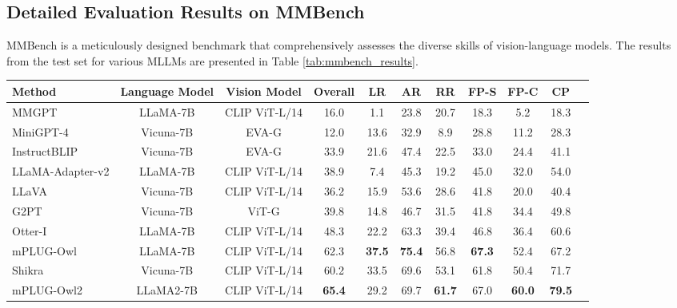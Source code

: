 \documentclass[10pt,twocolumn,letterpaper]{article}
\newcommand{\modelname}{mPLUG-Owl2\xspace}
\begin{document}
\subsection{Detailed Evaluation Results on MMBench}
MMBench \cite{liu2023mmbench} is a meticulously designed benchmark that comprehensively assesses the diverse skills of vision-language models. The results from the test set for various MLLMs are presented in Table \ref{tab:mmbench_results}.


\begin{table*}[!t]
\small
\centering
\begin{tabular}{l|cc|cccccccc}
\toprule
Method & Language Model & Vision Model & Overall & LR & AR & RR & FP-S & FP-C & CP \\
\midrule
MMGPT \cite{gong2023mmgpt} & LLaMA-7B & CLIP ViT-L/14 & 16.0 & 1.1 & 23.8 & 20.7 & 18.3 & 5.2 & 18.3 \\
MiniGPT-4 \cite{Zhu2023MiniGPT4} & Vicuna-7B & EVA-G & 12.0 & 13.6 & 32.9 & 8.9 & 28.8 & 11.2 & 28.3 \\
InstructBLIP \cite{Dai2023InstructBLIP} & Vicuna-7B & EVA-G & 33.9 & 21.6 & 47.4 & 22.5 & 33.0 & 24.4 & 41.1 \\
LLaMA-Adapter-v2 \cite{Gao2023LLaMAAdapterV2} & LLaMA-7B & CLIP ViT-L/14 & 38.9 & 7.4 & 45.3 & 19.2 & 45.0 & 32.0 & 54.0 \\
LLaVA \cite{Sun2023LLavaRlhf} & Vicuna-7B & CLIP ViT-L/14 & 36.2 & 15.9 & 53.6 & 28.6 & 41.8 & 20.0 & 40.4 \\
G2PT \cite{liu2023mmbench} & Vicuna-7B & ViT-G & 39.8 & 14.8 & 46.7 & 31.5 & 41.8 & 34.4 & 49.8 \\
Otter-I \cite{Li2023Otter} & LLaMA-7B & CLIP ViT-L/14 & 48.3 & 22.2 & 63.3 & 39.4 & 46.8 & 36.4 & 60.6 \\
mPLUG-Owl \cite{ye2023mplugowl} & LLaMA-7B & CLIP ViT-L/14 & 62.3 & \textbf{37.5} & \textbf{75.4} & 56.8 & \textbf{67.3} & 52.4 & 67.2 \\
Shikra \cite{Chen2023Shikra} & Vicuna-7B & CLIP ViT-L/14 & 60.2 & 33.5 & 69.6 & 53.1 & 61.8 & 50.4 & 71.7 \\
\midrule 
\modelname & LLaMA2-7B & CLIP ViT-L/14 & \textbf{65.4} & 29.2 & 69.7 & \textbf{61.7} & 67.0 & \textbf{60.0} & \textbf{79.5} \\
\bottomrule
\end{tabular}\caption{CircularEval multi-choice accuracy results on MMBench \cite{liu2023mmbench} dev set. We adopt the following
abbreviations: LR for Logical Reasoning; AR for Attribute Reasoning; RR for Relation Reasoning; FP-C for Fine-grained Perception (Cross Instance); FP-S for Fine-grained Perception (Single Instance); CP for Coarse Perception. Baseline results are taken from \cite{liu2023mmbench}.  denotes the model is carefully optimized for MMBench.}
\label{tab:mmbench_results}
\end{table*}
\end{document}
